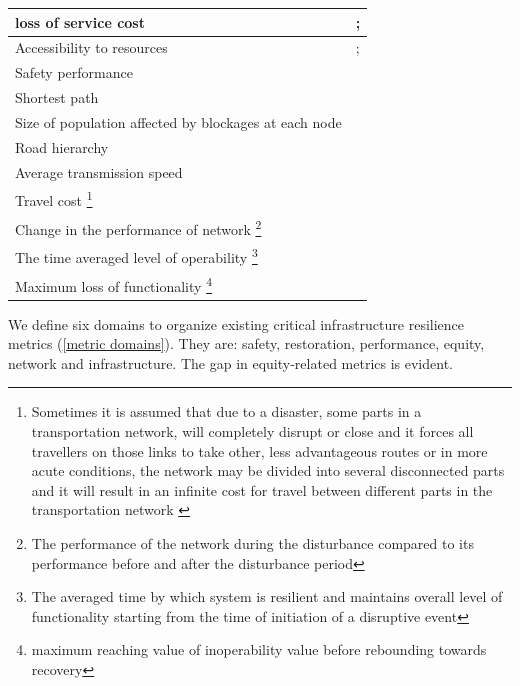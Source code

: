 \documentclass[11pt,twoside]{article}
\numberwithin{equation}{section}
\newcommand{\?}{\stackrel{?}{=}}
\begin{document}
\begin{table}[h!]
\begin{center}
\begin{tabular}{p{2in} p{3.5in}}
      loss of service cost & \citet{fang2016resiliencebased}; \citet{baroud2014inherent} \\\midrule
      Accessibility to resources & \citet{aydin2018framework}; \citet{ahmed2020resilience} \\\midrule
      Safety performance & \citet{ahmed2020resilience} \\\midrule
      Shortest path & \citet{ahmed2020resilience} \\\midrule
      Size of population affected by blockages at each node & \citet{aydin2018framework} \\\midrule
      Road hierarchy & \citet{aydin2018framework} \\\midrule
                       Average transmission speed & \citet{aleta2017multilayer} \\\midrule
      Travel cost \footnote{Sometimes it is assumed that due to a disaster, some parts in a transportation network, will completely disrupt or close and it forces all travellers on those links to take other, less advantageous routes or in more acute conditions, the network may be divided into several disconnected parts and it will result in an infinite cost for travel between different parts in the transportation network \citet{jenelius2006importance}} & \citet{jenelius2006importance} \\\midrule
      Change in the performance of network \footnote{The performance of the network during the disturbance compared to its performance before and after the disturbance period} & \citet{ilbeigi2019statistical} \\\midrule
      The time averaged level of operability \footnote{The averaged time by which system is resilient and maintains overall level of functionality starting from the time of initiation of a disruptive event} & \citet{pant2014static} \\\midrule
      Maximum loss of functionality \footnote{maximum reaching value of inoperability value before rebounding towards recovery} & \citet{pant2014static}\\ \bottomrule

    \end{tabular}
  \end{center}
\end{table}

We define six domains to organize existing critical infrastructure resilience metrics (\autoref{metric domains}). They are:
safety, restoration, performance, equity, network and infrastructure. The gap in equity-related metrics is evident.
\end{document}
